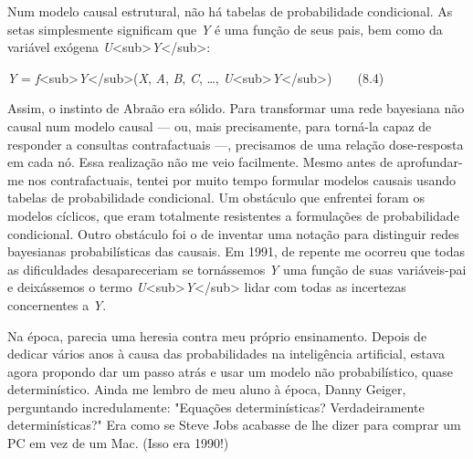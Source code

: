 \documentclass[11pt,a5paper,twoside]{book}
\begin{document}
Num modelo causal estrutural, não há tabelas de probabilidade condicional. As setas simplesmente significam que \textit{Y} é uma função de seus pais, bem como da variável exógena \textit{U}<sub>\textit{Y}</sub>:

\textit{Y} = \textit{f}<sub>\textit{Y}</sub>(\textit{X}, \textit{A}, \textit{B}, \textit{C}, …, \textit{U}<sub>\textit{Y}</sub>)  (8.4)

Assim, o instinto de Abraão era sólido. Para transformar uma rede bayesiana não causal num modelo causal — ou, mais precisamente, para torná-la capaz de responder a consultas contrafactuais —, precisamos de uma relação dose-resposta em cada nó. Essa realização não me veio facilmente. Mesmo antes de aprofundar-me nos contrafactuais, tentei por muito tempo formular modelos causais usando tabelas de probabilidade condicional. Um obstáculo que enfrentei foram os modelos cíclicos, que eram totalmente resistentes a formulações de probabilidade condicional. Outro obstáculo foi o de inventar uma notação para distinguir redes bayesianas probabilísticas das causais. Em 1991, de repente me ocorreu que todas as dificuldades desapareceriam se tornássemos \textit{Y} uma função de suas variáveis-pai e deixássemos o termo \textit{U}<sub>\textit{Y}</sub> lidar com todas as incertezas concernentes a \textit{Y}.

Na época, parecia uma heresia contra meu próprio ensinamento. Depois de dedicar vários anos à causa das probabilidades na inteligência artificial, estava agora propondo dar um passo atrás e usar um modelo não probabilístico, quase determinístico. Ainda me lembro de meu aluno à época, Danny Geiger, perguntando incredulamente: "Equações determinísticas? Verdadeiramente determinísticas?" Era como se Steve Jobs acabasse de lhe dizer para comprar um PC em vez de um Mac. (Isso era 1990!)
\end{document}
